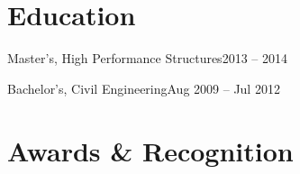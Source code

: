 \documentclass[letterpaper,11pt]{article}
\begin{document}
\section{Education}
\begin{outerList}
  {Master's, High Performance Structures}{2013 -- 2014}

  {Bachelor's, Civil Engineering}{Aug 2009 -- Jul 2012}
\end{outerList}

\section{Awards \& Recognition}
\begin{innerList}
\end{innerList}
\end{document}
